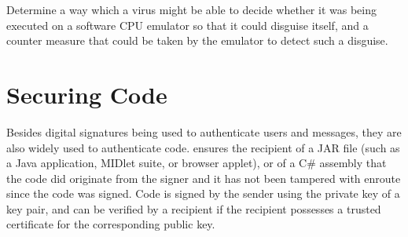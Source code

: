 \begin{exercise}
Determine a way which a virus might be able to decide whether it was being executed
on a software CPU emulator so that it could disguise itself, and a counter measure that
could be taken by the emulator to detect such a disguise.
\end{exercise}



\section{Securing Code}\label{Se:SecuringCode}


Besides digital signatures being used to authenticate users and messages, they are
also widely used to authenticate code.  ensures the
recipient of a JAR file (such as a Java application, MIDlet suite, or browser applet),
or of a C\# assembly that the code did originate from the signer
and it has not been tampered with enroute since the code was signed.
Code is signed by the sender using the private key of a key pair, and can be verified
by a recipient if the recipient possesses a trusted certificate for the corresponding public key.


